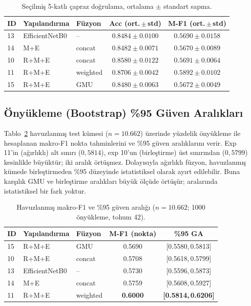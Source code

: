 \begin{table}[H]
\centering
\caption{Seçilmiş 5-katlı çapraz doğrulama, ortalama $\pm$ standart sapma.}
\label{tab:cv}
\begin{tabular}{ll l cc}
\toprule
ID & Yapılandırma & Füzyon & Acc (ort.\,$\pm$\,std) & M-F1 (ort.\,$\pm$\,std) \\
\midrule
13 & EfficientNetB0 & --       & $0.8484 \pm 0.0100$ & $0.5690 \pm 0.0158$ \\
14 & M+E            & concat   & $0.8482 \pm 0.0071$ & $0.5670 \pm 0.0089$ \\
10 & R+M+E          & concat   & $0.8580 \pm 0.0122$ & $0.5691 \pm 0.0064$ \\
11 & R+M+E          & weighted & $\mathbf{0.8706 \pm 0.0042}$ & $\mathbf{0.5892 \pm 0.0102}$ \\
15 & R+M+E          & GMU      & $0.8480 \pm 0.0063$ & $0.5672 \pm 0.0049$ \\
\bottomrule
\end{tabular}
\end{table}

\subsection{Önyükleme (Bootstrap) \%95 Güven Aralıkları}
\label{subsec:t2b}
Tablo~\ref{tab:ci} havuzlanmış test kümesi ($n = 10{.}662$) üzerinde yüzdelik
önyükleme ile hesaplanan makro-F1 nokta tahminlerini ve \%95 güven aralıklarını
verir. Exp 11'in (ağırlıklı) alt sınırı ($0{,}5814$), exp 10'un (birleştirme)
üst sınırından ($0{,}5799$) kesinlikle büyüktür; iki aralık örtüşmez. Dolayısıyla
ağırlıklı füzyon, havuzlanmış kümede birleştirmeden \%95 düzeyinde istatistiksel
olarak ayırt edilebilir. Buna karşılık GMU ve birleştirme aralıkları büyük ölçüde
örtüşür; aralarında istatistiksel bir fark yoktur.

\begin{table}[H]
\centering
\caption{Havuzlanmış makro-F1 ve \%95 güven aralığı ($n=10{.}662$; 1000 önyükleme,
tohum 42).}
\label{tab:ci}
\begin{tabular}{ll l c c}
\toprule
ID & Yapılandırma & Füzyon & M-F1 (nokta) & \%95 GA \\
\midrule
15 & R+M+E & GMU      & 0.5690 & [0.5580,\,0.5813] \\
10 & R+M+E & concat   & 0.5708 & [0.5618,\,0.5799] \\
13 & EfficientNetB0 & -- & 0.5730 & [0.5596,\,0.5873] \\
14 & M+E   & concat   & 0.5759 & [0.5608,\,0.5927] \\
11 & R+M+E & weighted & \textbf{0.6000} & \textbf{[0.5814,\,0.6206]} \\
\bottomrule
\end{tabular}
\end{table}


